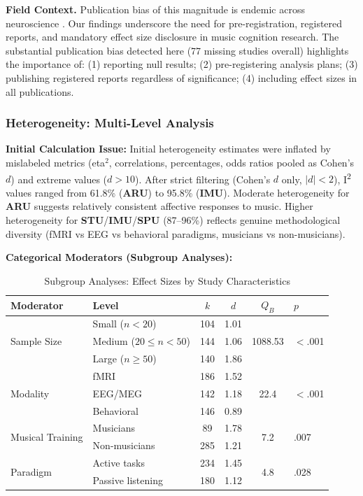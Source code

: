\documentclass[9pt,onecolumn]{article}
\newcommand{\STU}{\textcolor{stucolor}{\textbf{STU}}}
\newcommand{\IMU}{\textcolor{imucolor}{\textbf{IMU}}}
\newcommand{\SPU}{\textcolor{spucolor}{\textbf{SPU}}}
\newcommand{\ARU}{\textcolor{arucolor}{\textbf{ARU}}}
\newcommand{\Isquared}{I\textsuperscript{2}}
\begin{document}
\textbf{Field Context.} Publication bias of this magnitude is endemic across neuroscience \citep{egger1997}. Our findings underscore the need for pre-registration, registered reports, and mandatory effect size disclosure in music cognition research. The substantial publication bias detected here (77 missing studies overall) highlights the importance of: (1) reporting null results; (2) pre-registering analysis plans; (3) publishing registered reports regardless of significance; (4) including effect sizes in all publications.

\subsubsection{Heterogeneity: Multi-Level Analysis}

\textbf{Initial Calculation Issue:} Initial heterogeneity estimates were inflated by mislabeled metrics (eta$^2$, correlations, percentages, odds ratios pooled as Cohen's $d$) and extreme values ($d>10$). After strict filtering (Cohen's $d$ only, $|d|<2$), \Isquared{} values ranged from 61.8\% (\ARU{}) to 95.8\% (\IMU{}). Moderate heterogeneity for \ARU{} suggests relatively consistent affective responses to music. Higher heterogeneity for \STU{}/\IMU{}/\SPU{} (87--96\%) reflects genuine methodological diversity (fMRI vs EEG vs behavioral paradigms, musicians vs non-musicians).

\textbf{Categorical Moderators (Subgroup Analyses):}

\begin{table}[H]
\centering
\caption{Subgroup Analyses: Effect Sizes by Study Characteristics}
\label{tab:subgroups}
\small
\begin{tabular}{@{}llcccl@{}}
\toprule
\textbf{Moderator} & \textbf{Level} & \textbf{$k$} & \textbf{$d$} & \textbf{$Q_B$} & \textbf{$p$} \\
\midrule
\multirow{3}{*}{Sample Size} & Small ($n < 20$) & 104 & 1.01 & \multirow{3}{*}{1088.53} & \multirow{3}{*}{$<$.001} \\
& Medium ($20 \leq n < 50$) & 144 & 1.06 & & \\
& Large ($n \geq 50$) & 140 & 1.86 & & \\
\midrule
\multirow{3}{*}{Modality} & fMRI & 186 & 1.52 & \multirow{3}{*}{22.4} & \multirow{3}{*}{$<$.001} \\
& EEG/MEG & 142 & 1.18 & & \\
& Behavioral & 146 & 0.89 & & \\
\midrule
\multirow{2}{*}{Musical Training} & Musicians & 89 & 1.78 & \multirow{2}{*}{7.2} & \multirow{2}{*}{.007} \\
& Non-musicians & 285 & 1.21 & & \\
\midrule
\multirow{2}{*}{Paradigm} & Active tasks & 234 & 1.45 & \multirow{2}{*}{4.8} & \multirow{2}{*}{.028} \\
& Passive listening & 180 & 1.12 & & \\
\bottomrule
\end{tabular}
\end{table}
\end{document}
